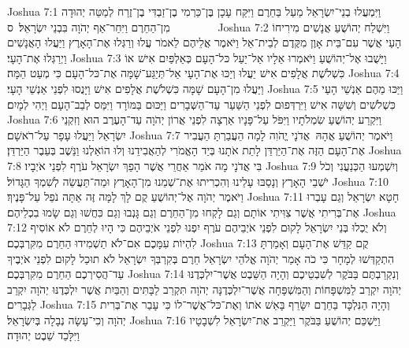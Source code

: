 Joshua 7:1	וַיִּמְעֲלוּ בְנֵי־יִשְׂרָאֵל מַעַל בַּחֵרֶם וַיִּקַּח עָכָן בֶּן־כַּרְמִי בֶן־זַבְדִּי בֶן־זֶרַח לְמַטֵּה יְהוּדָה מִן־הַחֵרֶם וַיִּחַר־אַף יְהֹוָה בִּבְנֵי יִשְׂרָאֵל׃ {ס}        
Joshua 7:2	וַיִּשְׁלַח יְהוֹשֻׁעַ אֲנָשִׁים מִירִיחוֹ הָעַי אֲשֶׁר עִם־בֵּית אָוֶן מִקֶּדֶם לְבֵית־אֵל וַיֹּאמֶר אֲלֵיהֶם לֵאמֹר עֲלוּ וְרַגְּלוּ אֶת־הָאָרֶץ וַיַּעֲלוּ הָאֲנָשִׁים וַיְרַגְּלוּ אֶת־הָעָי׃
Joshua 7:3	וַיָּשֻׁבוּ אֶל־יְהוֹשֻׁעַ וַיֹּאמְרוּ אֵלָיו אַל־יַעַל כּל־הָעָם כְּאַלְפַּיִם אִישׁ אוֹ כִּשְׁלֹשֶׁת אֲלָפִים אִישׁ יַעֲלוּ וְיַכּוּ אֶת־הָעָי אַל־תְּיַגַּע־שָׁמָּה אֶת־כּל־הָעָם כִּי מְעַט הֵמָּה׃
Joshua 7:4	וַיַּעֲלוּ מִן־הָעָם שָׁמָּה כִּשְׁלֹשֶׁת אֲלָפִים אִישׁ וַיָּנֻסוּ לִפְנֵי אַנְשֵׁי הָעָי׃
Joshua 7:5	וַיַּכּוּ מֵהֶם אַנְשֵׁי הָעַי כִּשְׁלֹשִׁים וְשִׁשָּׁה אִישׁ וַיִּרְדְּפוּם לִפְנֵי הַשַּׁעַר עַד־הַשְּׁבָרִים וַיַּכּוּם בַּמּוֹרָד וַיִּמַּס לְבַב־הָעָם וַיְהִי לְמָיִם׃
Joshua 7:6	וַיִּקְרַע יְהוֹשֻׁעַ שִׂמְלֹתָיו וַיִּפֹּל עַל־פָּנָיו אַרְצָה לִפְנֵי אֲרוֹן יְהֹוָה עַד־הָעֶרֶב הוּא וְזִקְנֵי יִשְׂרָאֵל וַיַּעֲלוּ עָפָר עַל־רֹאשָׁם׃
Joshua 7:7	וַיֹּאמֶר יְהוֹשֻׁעַ אֲהָהּ  אֲדֹנָי יֱהֹוִה לָמָה הֵעֲבַרְתָּ הַעֲבִיר אֶת־הָעָם הַזֶּה אֶת־הַיַּרְדֵּן לָתֵת אֹתָנוּ בְּיַד הָאֱמֹרִי לְהַאֲבִידֵנוּ וְלוּ הוֹאַלְנוּ וַנֵּשֶׁב בְּעֵבֶר הַיַּרְדֵּן׃
Joshua 7:8	בִּי אֲדֹנָי מָה אֹמַר אַחֲרֵי אֲשֶׁר הָפַךְ יִשְׂרָאֵל עֹרֶף לִפְנֵי אֹיְבָיו׃
Joshua 7:9	וְיִשְׁמְעוּ הַכְּנַעֲנִי וְכֹל יֹשְׁבֵי הָאָרֶץ וְנָסַבּוּ עָלֵינוּ וְהִכְרִיתוּ אֶת־שְׁמֵנוּ מִן־הָאָרֶץ וּמַה־תַּעֲשֵׂה לְשִׁמְךָ הַגָּדוֹל׃
Joshua 7:10	וַיֹּאמֶר יְהֹוָה אֶל־יְהוֹשֻׁעַ קֻם לָךְ לָמָּה זֶּה אַתָּה נֹפֵל עַל־פָּנֶיךָ׃
Joshua 7:11	חָטָא יִשְׂרָאֵל וְגַם עָבְרוּ אֶת־בְּרִיתִי אֲשֶׁר צִוִּיתִי אוֹתָם וְגַם לָקְחוּ מִן־הַחֵרֶם וְגַם גָּנְבוּ וְגַם כִּחֲשׁוּ וְגַם שָׂמוּ בִכְלֵיהֶם׃
Joshua 7:12	וְלֹא יֻכְלוּ בְּנֵי יִשְׂרָאֵל לָקוּם לִפְנֵי אֹיְבֵיהֶם עֹרֶף יִפְנוּ לִפְנֵי אֹיְבֵיהֶם כִּי הָיוּ לְחֵרֶם לֹא אוֹסִיף לִהְיוֹת עִמָּכֶם אִם־לֹא תַשְׁמִידוּ הַחֵרֶם מִקִּרְבְּכֶם׃
Joshua 7:13	קֻם קַדֵּשׁ אֶת־הָעָם וְאָמַרְתָּ הִתְקַדְּשׁוּ לְמָחָר כִּי כֹה אָמַר יְהֹוָה אֱלֹהֵי יִשְׂרָאֵל חֵרֶם בְּקִרְבְּךָ יִשְׂרָאֵל לֹא תוּכַל לָקוּם לִפְנֵי אֹיְבֶיךָ עַד־הֲסִירְכֶם הַחֵרֶם מִקִּרְבְּכֶם׃
Joshua 7:14	וְנִקְרַבְתֶּם בַּבֹּקֶר לְשִׁבְטֵיכֶם וְהָיָה הַשֵּׁבֶט אֲשֶׁר־יִלְכְּדֶנּוּ יְהֹוָה יִקְרַב לַמִּשְׁפָּחוֹת וְהַמִּשְׁפָּחָה אֲשֶׁר־יִלְכְּדֶנָּה יְהֹוָה תִּקְרַב לַבָּתִּים וְהַבַּיִת אֲשֶׁר יִלְכְּדֶנּוּ יְהֹוָה יִקְרַב לַגְּבָרִים׃
Joshua 7:15	וְהָיָה הַנִּלְכָּד בַּחֵרֶם יִשָּׂרֵף בָּאֵשׁ אֹתוֹ וְאֶת־כּל־אֲשֶׁר־לוֹ כִּי עָבַר אֶת־בְּרִית יְהֹוָה וְכִי־עָשָׂה נְבָלָה בְּיִשְׂרָאֵל׃
Joshua 7:16	וַיַּשְׁכֵּם יְהוֹשֻׁעַ בַּבֹּקֶר וַיַּקְרֵב אֶת־יִשְׂרָאֵל לִשְׁבָטָיו וַיִּלָּכֵד שֵׁבֶט יְהוּדָה׃
